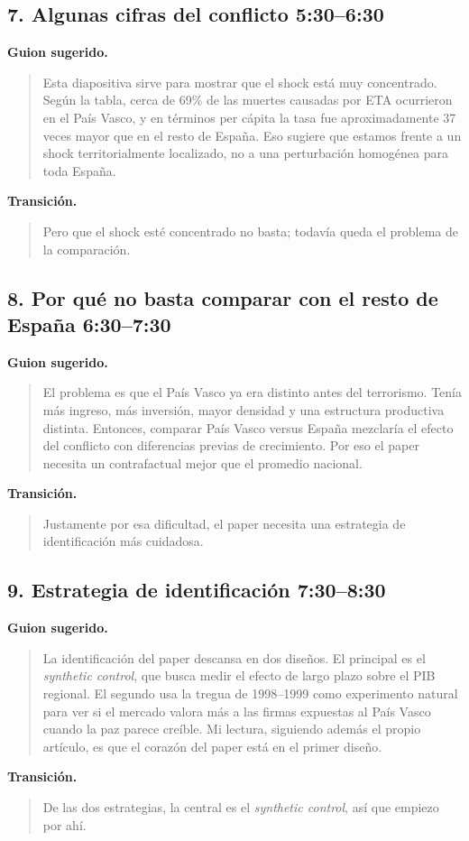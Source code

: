 \documentclass[11pt]{article}
\newcommand{\slideentry}[2]{\subsection*{#1 \hfill #2}}
\begin{document}
\slideentry{7. Algunas cifras del conflicto}{5:30--6:30}

\textbf{Guion sugerido.}
\begin{quote}
Esta diapositiva sirve para mostrar que el shock está muy concentrado. Según la tabla, cerca de 69\% de las muertes causadas por ETA ocurrieron en el País Vasco, y en términos per cápita la tasa fue aproximadamente 37 veces mayor que en el resto de España. Eso sugiere que estamos frente a un shock territorialmente localizado, no a una perturbación homogénea para toda España.
\end{quote}

\textbf{Transición.}
\begin{quote}
Pero que el shock esté concentrado no basta; todavía queda el problema de la comparación.
\end{quote}

\slideentry{8. Por qué no basta comparar con el resto de España}{6:30--7:30}

\textbf{Guion sugerido.}
\begin{quote}
El problema es que el País Vasco ya era distinto antes del terrorismo. Tenía más ingreso, más inversión, mayor densidad y una estructura productiva distinta. Entonces, comparar País Vasco versus España mezclaría el efecto del conflicto con diferencias previas de crecimiento. Por eso el paper necesita un contrafactual mejor que el promedio nacional.
\end{quote}

\textbf{Transición.}
\begin{quote}
Justamente por esa dificultad, el paper necesita una estrategia de identificación más cuidadosa.
\end{quote}

\slideentry{9. Estrategia de identificación}{7:30--8:30}

\textbf{Guion sugerido.}
\begin{quote}
La identificación del paper descansa en dos diseños. El principal es el \emph{synthetic control}, que busca medir el efecto de largo plazo sobre el PIB regional. El segundo usa la tregua de 1998--1999 como experimento natural para ver si el mercado valora más a las firmas expuestas al País Vasco cuando la paz parece creíble. Mi lectura, siguiendo además el propio artículo, es que el corazón del paper está en el primer diseño.
\end{quote}

\textbf{Transición.}
\begin{quote}
De las dos estrategias, la central es el \emph{synthetic control}, así que empiezo por ahí.
\end{quote}
\end{document}
